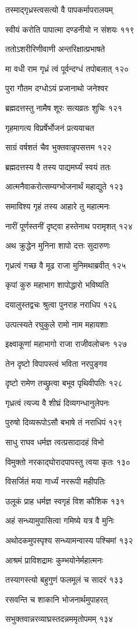 तस्माद्गृध्रस्त्वसत्यो वै पापकर्मापरालयम्

स्वीयं करोति पापात्मा दण्डनीयो न संशयः ११९

ततोऽशरीरिणीवाणी अन्तरिक्षात्प्रभाषते

मा वधी राम गृध्रं त्वं पूर्वन्दग्धं तपोबलात् १२०

पुरा गौतम दग्धोऽयं प्रजानाथो जनेश्वर

ब्रह्मदत्तस्तु नामैष शूरः सत्यव्रतः शुचिः १२१

गृहमागत्य विप्रर्षेर्भोजनं प्रत्ययाचत

साग्रं वर्षशतं चैव भुक्तवान्नृपसत्तम १२२

ब्रह्मदत्तस्य वै तस्य पाद्यमर्घ्यं स्वयं ततः

आत्मनैवाकरोत्सम्यग्भोजनार्थं महाद्युते १२३

समाविश्य गृहं तस्य आहारे तु महात्मनः

नारीं पूर्णस्तनीं दृष्ट्वा हस्तेनाथ परामृशत् १२४

अथ क्रुद्धेन मुनिना शापो दत्तः सुदारुणः

गृध्रत्वं गच्छ वै मूढ राजा मुनिमथाब्रवीत् १२५

कृपां कुरु महाभाग शापोद्धारो भविष्यति

दयालुस्तद्वचः श्रुत्वा पुनराह नराधिप १२६

उत्पत्स्यते रघुकुले रामो नाम महायशाः

इक्ष्वाकूणां महाभागो राजा राजीवलोचनः १२७

तेन दृष्टो विपापस्त्वं भविता नरपुङ्गव

दृष्टो रामेण तच्छ्रुत्वा बभूव पृथिवीपतिः १२८

गृध्रत्वं त्यज्य वै शीघ्रं दिव्यगन्धानुलेपनः

पुरुषो दिव्यरूपोऽसौ बभाषे तं नराधिपं १२९

साधु राघव धर्मज्ञ त्वत्प्रसादादहं विभो

विमुक्तो नरकाद्घोरादपापस्तु त्वया कृतः १३०

विसर्जितं मया गार्ध्यं नररूपी महीपतिः

उलूकं प्राह धर्मज्ञ स्वगृहं विश कौशिक १३१

अहं सन्ध्यामुपासित्वा गमिष्ये यत्र वै मुनिः

अथोदकमुपस्पृश्य सन्ध्यामन्वास्य पश्चिमां १३२

आश्रमं प्राविशद्रामः कुम्भयोनेर्महात्मनः

तस्यागस्त्यो बहुगुणं फलमूलं च सादरं १३३

रसवन्ति च शाकानि भोजनार्थमुपाहरत्

सभुक्तवान्नरव्याघ्रस्तदन्नममृतोपमम् १३४

